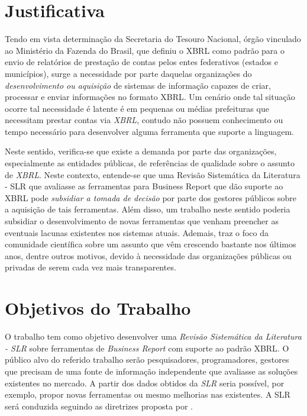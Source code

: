 \documentclass{article}
\begin{document}
\section{Justificativa}
\label{sec:contexto}

Tendo em vista determinação da Secretaria do Tesouro Nacional, órgão
vinculado ao  Ministério da Fazenda do Brasil, que definiu o XBRL como
padrão para o envio de relatórios de prestação de contas pelos entes
federativos (estados e municípios), surge a necessidade por parte
daquelas organizações do \textit{desenvolvimento ou aquisição} de sistemas de
informação capazes de criar, processar e enviar informações no formato
XBRL. Um cenário onde tal situação ocorre tal necessidade é latente é em pequenas ou médias
prefeituras que necessitam prestar contas via \textit{XBRL}, contudo
não possuem conhecimento ou tempo necessário para desenvolver alguma
ferramenta que suporte a linguagem.

Neste sentido, verifica-se que existe a demanda por parte das
organizações, especialmente as entidades públicas, de referências de
qualidade sobre o assunto de \textit{XBRL}. Neste contexto, entende-se que uma Revisão Sistemática da
  Literatura - SLR  que avaliasse as ferramentas para Business Report que dão suporte ao
XBRL pode \textit{subsidiar a tomada de decisão} por parte dos gestores
públicos sobre a aquisição de tais ferramentas. Além disso, um trabalho neste sentido poderia subsidiar o
desenvolvimento de novas ferramentas que venham preencher as eventuais
lacunas existentes nos sistemas atuais. Ademais,
traz o foco da comunidade científica sobre um assunto que vêm
crescendo bastante nos últimos anos, dentre outros motivos, devido
à necessidade das organizações públicas ou privadas de serem cada vez mais transparentes. 

\section{Objetivos do Trabalho}
\label{sec:objetivos}

O trabalho tem como objetivo desenvolver  uma \textit{Revisão Sistemática da Literatura -
  SLR} sobre ferramentas de \textit{Business Report} com suporte ao padrão XBRL. O público alvo do referido trabalho serão pesquisadores,
programadores, gestores que precisam de uma fonte de informação independente que avaliasse as soluções existentes no mercado. A partir
dos dados obtidos da \textit{SLR} seria possível, por exemplo, propor novas ferramentas ou mesmo melhorias nas existentes. A SLR será
conduzida seguindo as diretrizes proposta por \cite{keele2007guidelines,wohlin2012experimentation}.
\end{document}

